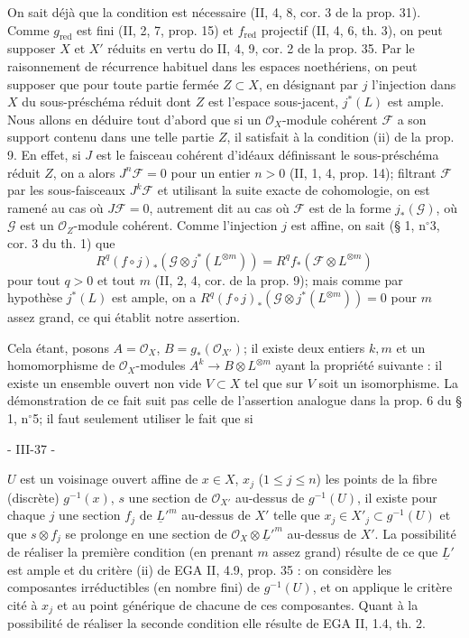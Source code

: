 On sait déjà que la condition est nécessaire (II, 4, 8, cor. 3 de la prop. 31). Comme $g_{\text{red}}$ est fini (II, 2, 7, prop. 15) et $f_{\text{red}}$ projectif (II, 4, 6, th. 3), on peut supposer $X$ et $X'$ réduits en vertu do II, 4, 9, cor. 2 de la prop. 35. Par le raisonnement de récurrence habituel dans les espaces noethériens, on peut supposer que pour toute partie fermée $Z \subset X$, en désignant par $j$ l'injection dans $X$ du sous-préschéma réduit dont $Z$ est l'espace sous-jacent, $j^*(L)$ est ample. Nous allons en déduire tout d'abord que si un $\mathcal{O}_X$-module cohérent $\mathcal{F}$ a son support contenu dans une telle partie $Z$, il satisfait à la condition (ii) de la prop. 9. En effet, si $J$ est le faisceau cohérent d'idéaux définissant le sous-préschéma réduit $Z$, on a alors $J^n\mathcal{F}=0$ pour un entier $n > 0$ (II, 1, 4, prop. 14); filtrant $\mathcal{F}$ par les sous-faisceaux $J^k\mathcal{F}$ et utilisant la suite exacte de cohomologie, on est ramené au cas où $J\mathcal{F}=0$, autrement dit au cas où $\mathcal{F}$ est de la forme $j_*(\mathcal{G})$, où $\mathcal{G}$ est un $\mathcal{O}_Z$-module cohérent. Comme l'injection $j$ est affine, on sait (§ 1, n$^\circ$3, cor. 3 du th. 1) que
$$ R^q(f \circ j)_*(\mathcal{G} \otimes j^*(L^{\otimes m})) = R^qf_*(\mathcal{F} \otimes L^{\otimes m}) $$
pour tout $q > 0$ et tout $m$ (II, 2, 4, cor. de la prop. 9); mais comme par hypothèse $j^*(L)$ est ample, on a $R^q(f \circ j)_*(\mathcal{G} \otimes j^*(L^{\otimes m})) = 0$ pour $m$ assez grand, ce qui établit notre assertion.

Cela étant, posons $A = \mathcal{O}_X$, $B = g_*(\mathcal{O}_{X'})$; il existe deux entiers $k, m$ et un homomorphisme de $\mathcal{O}_X$-modules $A^k \to B \otimes L^{\otimes m}$ ayant la propriété suivante : il existe un ensemble ouvert non vide $V \subset X$ tel que sur $V$ soit un isomorphisme. La démonstration de ce fait suit pas celle de l'assertion analogue dans la prop. 6 du § 1, n$^\circ$5; il faut seulement utiliser le fait que si

\newpage


- III-37 -

$U$ est un voisinage ouvert affine de $x \in X$, $x_j$ ($1 \le j \le n$) les points de la fibre (discrète) $g^{-1}(x)$, $s$ une section de $\mathcal{O}_{X'}$ au-dessus de $g^{-1}(U)$, il existe pour chaque $j$ une section $f_j$ de $\underline{L}'^m$ au-dessus de $X'$ telle que $x_j \in X'_j \subset g^{-1}(U)$ et que $s \otimes f_j$ se prolonge en une section de $\mathcal{O}_X \otimes \underline{L}'^m$ au-dessus de $X'$. La possibilité de réaliser la première condition (en prenant $m$ assez grand) résulte de ce que $\underline{L}'$ est ample et du critère (ii) de EGA II, 4.9, prop. 35 : on considère les composantes irréductibles (en nombre fini) de $g^{-1}(U)$, et on applique le critère cité à $x_j$ et au point générique de chacune de ces composantes. Quant à la possibilité de réaliser la seconde condition elle résulte de EGA II, 1.4, th. 2.


